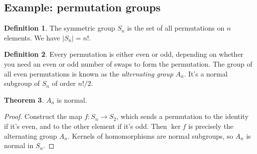 \documentclass[12pt, letterpaper]{article}
\theoremstyle{definition} %
\newtheorem{thm}{Theorem}[section] %
\newtheorem{defn}[thm]{Definition} %
\begin{document}
\subsection{Example: permutation groups}

\begin{defn}
  The symmetric group $S_n$ is the set of all permutations on $n$ elements. We have $|S_n|=n!$.
\end{defn}
\begin{defn}
  Every permutation is either even or odd, depending on whether you need an even or odd number of swaps to form the permutation. The group of all even permutations is known as
  the \emph{alternating group} $A_n$. It's a normal subgroup of $S_n$ of order $n!/2$.
\end{defn}
\begin{thm}
  $A_n$ is normal.
\end{thm}
\begin{proof}   Construct the map $f:S_n\to S_2$, which sends a permutation to the identity if it's even, and to the other element if it's odd. 
  Then $\ker f$ is precisely the alternating group $A_n$. Kernels of homomorphisms are
  normal subgroups, so $A_n$ is normal in $S_n$.
\end{proof}
\end{document}
